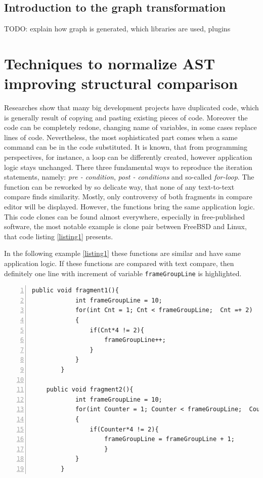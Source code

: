 \documentclass{report}
\begin{document}
\section{Introduction to the graph transformation}
\label{sec:graph-transformation}

TODO: explain how graph is generated, which libraries are used, plugins

\chapter{Techniques to normalize AST improving structural comparison}
\label{sec:ast_normal}
Researches show that many big development projects have duplicated code, which is generally result of copying and pasting existing pieces of code. Moreover the code can be completely redone, changing name of variables, in some cases replace lines of code. Nevertheless, the most sophisticated part comes when a same command can be in the code substituted. It is known, that from programming perspectives, for instance, a loop can be differently created, however application logic stays unchanged. There three fundamental ways to reproduce the iteration statements, namely: \emph{pre - condition}, \emph{post - conditions} and so-called \emph{for-loop}. The function can be reworked by so delicate way, that none of any text-to-text compare finds similarity. Mostly, only controversy of both fragments in compare editor will be displayed.
However, the functions bring the same application logic. This code clones can be found almost everywhere, especially in free-published software, the most notable example is clone pair between FreeBSD and Linux, that code listing \ref{listing1} presents. 

In the following example \ref{listing1} these functions are similar and have same application logic. If these functions are compared with text compare, then definitely one line with increment of variable \texttt{frameGroupLine} is highlighted. 
\newpage
\begin{lstlisting}[caption={Clone pair between FreeBSD and Linux}, label = listing1, numbers=left, numbersep=-5pt]
	public void fragment1(){
			int frameGroupLine = 10;
			for(int Cnt = 1; Cnt < frameGroupLine;  Cnt =+ 2)
			{
				if(Cnt*4 != 2){
					frameGroupLine++;
				}
			}
		}
			
	public void fragment2(){
			int frameGroupLine = 10;
			for(int Counter = 1; Counter < frameGroupLine;  Counter =+ 2)
			{
				if(Counter*4 != 2){ 
					frameGroupLine = frameGroupLine + 1;
					}
			}
		}	
\end{lstlisting}
\end{document}
